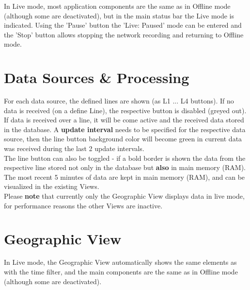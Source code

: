 In Live mode, most application components are the same as in Offline mode (although some are deactivated), but in the main status bar the Live mode is indicated. Using the 'Pause' button the 'Live: Paused' mode can be entered and the 'Stop' button allows stopping the network recording and returning to Offline mode.

\section{Data Sources \& Processing}

For each data source, the defined lines are shown (as L1 ... L4 buttons). If no data is received (on a define Line), the respective button is disabled (greyed out). If data is received over a line, it will be come active and the received data stored in the database. A \textbf{update interval} needs to be specified for the respective data source, then the line button background color will become green in current data was received during the last 2 update intervals. \\

The line button can also be toggled - if a bold border is shown the data from the respective line stored not only in the database but \textbf{also} in main memory (RAM). The most recent 5 minutes of data are kept in main memory (RAM), and can be visualized in the existing Views. \\

Please \textbf{note} that currently only the Geographic View displays data in live mode, for performance reasons the other Views are inactive.

\section{Geographic View}

In Live mode, the Geographic View automatically shows the same elements as with the time filter, and the main components are the same as in Offline mode (although some are deactivated).

